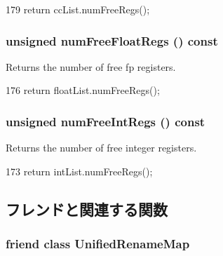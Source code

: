 \begin{DoxyCode}
179 { return ccList.numFreeRegs(); }
\end{DoxyCode}
\hypertarget{classUnifiedFreeList_a0d8bdfb9e786b20fb4498710d0a86675}{
\subsubsection[{numFreeFloatRegs}]{\setlength{\rightskip}{0pt plus 5cm}unsigned numFreeFloatRegs () const}}
\label{classUnifiedFreeList_a0d8bdfb9e786b20fb4498710d0a86675}
Returns the number of free fp registers. 


\begin{DoxyCode}
176 { return floatList.numFreeRegs(); }
\end{DoxyCode}
\hypertarget{classUnifiedFreeList_a8c5be7cb6eaa4a7508a868836257dbfe}{
\subsubsection[{numFreeIntRegs}]{\setlength{\rightskip}{0pt plus 5cm}unsigned numFreeIntRegs () const}}
\label{classUnifiedFreeList_a8c5be7cb6eaa4a7508a868836257dbfe}
Returns the number of free integer registers. 


\begin{DoxyCode}
173 { return intList.numFreeRegs(); }
\end{DoxyCode}


\subsection{フレンドと関連する関数}
\hypertarget{classUnifiedFreeList_a0fd5167b0ca5092436903818ae92db1a}{
\subsubsection[{UnifiedRenameMap}]{\setlength{\rightskip}{0pt plus 5cm}friend class {\bf UnifiedRenameMap}}}
\label{classUnifiedFreeList_a0fd5167b0ca5092436903818ae92db1a}


